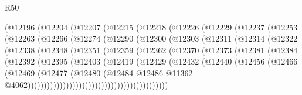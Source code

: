 \begin{lexlean}{R50}
\begin{coremodule}
            (@12196
              (@12204
                (@12207
                  (@12215
                    (@12218
                      (@12226
                        (@12229
                          (@12237
                            (@12253
                              (@12263
                                (@12266
                                  (@12274
                                    (@12290
                                      (@12300
                                        (@12303
                                          (@12311
                                            (@12314
                                              (@12322
                                                (@12338
                                                  (@12348
                                                    (@12351
                                                      (@12359
                                                        (@12362
                                                          (@12370
                                                            (@12373
                                                              (@12381
                                                                (@12384
                                                                  (@12392
                                                                    (@12395
                                                                      (@12403
                                                                        (@12419
                                                                          (@12429
                                                                            (@12432
                                                                              (@12440
                                                                                (@12456
                                                                                  (@12466
                                                                                    (@12469
                                                                                      (@12477
                                                                                        (@12480
                                                                                          (@12484
                                                                                            @12486
                                                                                            @11362
                                                                                            @4062))))))))))))))))))))))))))))))))))))))))))))

\end{coremodule}
\end{lexlean}
